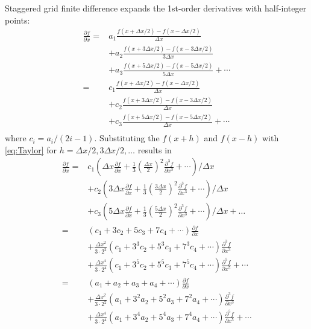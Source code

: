Staggered grid finite difference expands the 1st-order derivatives with half-integer points:
\begin{equation}
 \begin{split}
\frac{\partial f}{\partial x}=&a_1\frac{f(x+\Delta x/2)-f(x-\Delta x/2)}{\Delta x}\\
&+a_2\frac{f(x+3\Delta x/2)-f(x-3\Delta x/2)}{3\Delta x}\\
&+a_3\frac{f(x+5\Delta x/2)-f(x-5\Delta x/2)}{5\Delta x}+\cdots\\
=&c_1\frac{f(x+\Delta x/2)-f(x-\Delta x/2)}{\Delta x}\\
&+c_2\frac{f(x+3\Delta x/2)-f(x-3\Delta x/2)}{\Delta x}\\
&+c_3\frac{f(x+5\Delta x/2)-f(x-5\Delta x/2)}{\Delta x}+\cdots\\
 \end{split}
\end{equation}
where $c_i=a_i/(2i-1)$. Substituting the $f(x+h)$ and $f(x-h)$ with \eqref{eq:Taylor} for $h=\Delta x/2,3\Delta x/2, \ldots$ results in
\begin{equation}
\begin{split}
\frac{\partial f}{\partial x}=&c_1\left(\Delta x \frac{\partial f}{\partial x}+\frac{1}{3}(\frac{\Delta x}{2})^2\frac{\partial^3 f}{\partial x^3}+\cdots\right)/{\Delta x}\\
&+c_2\left(3\Delta x \frac{\partial f}{\partial x}+\frac{1}{3}(\frac{3\Delta x}{2})^2\frac{\partial^3 f}{\partial x^3}+\cdots\right)/{\Delta x}\\
&+c_3\left(5\Delta x \frac{\partial f}{\partial x}+\frac{1}{3}(\frac{5\Delta x}{2})^2\frac{\partial^3 f}{\partial x^3}+\cdots\right)/{\Delta x}+\ldots\\
=&(c_1+3c_2+5c_3+7c_4+\cdots)\frac{\partial f}{\partial x}\\
&+\frac{\Delta x^2}{3\cdot 2^2}(c_1+3^3c_2+5^3c_3+7^3c_4+\cdots)\frac{\partial^3 f}{\partial x^3}\\
&+\frac{\Delta x^4}{3\cdot 2^4}(c_1+3^5c_2+5^5c_3+7^5c_4+\cdots)\frac{\partial^5 f}{\partial x^5}+\cdots\\
=&(a_1+a_2+a_3+a_4+\cdots)\frac{\partial f}{\partial x}\\
&+\frac{\Delta x^2}{3\cdot 2^2}(a_1+3^2a_2+5^2a_3+7^2a_4+\cdots)\frac{\partial^3 f}{\partial x^3}\\
&+\frac{\Delta x^4}{3\cdot 2^4}(a_1+3^4a_2+5^4a_3+7^4a_4+\cdots)\frac{\partial^5 f}{\partial x^5}+\cdots\\
\end{split}
\end{equation}
